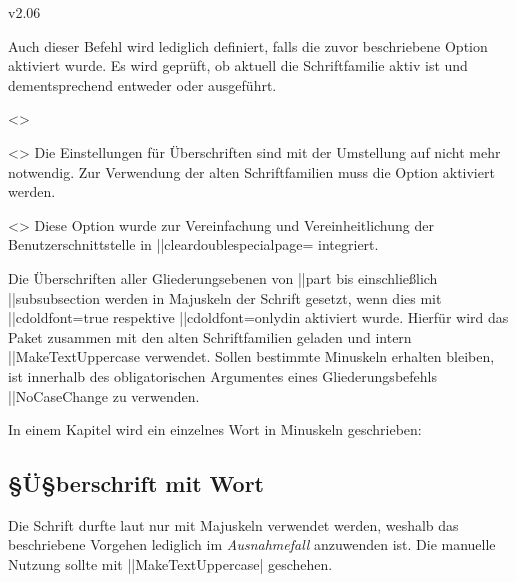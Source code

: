 \begin{Changes}{v2.06}
\begin{Obsolete}
  {}
\printdeclarationlist
%
Auch dieser Befehl wird lediglich definiert, falls die zuvor beschriebene 
Option  aktiviert wurde. Es wird geprüft, ob aktuell die 
Schriftfamilie \DIN aktiv ist und dementsprechend entweder  
oder  ausgeführt. 
\end{Obsolete}

\begin{Obsolete}
  {}
  <>
\begin{Obsolete}
  {}
  <>
\printdeclarationlist
%
Die Einstellungen für Überschriften sind mit der Umstellung auf \OpenSans nicht 
mehr notwendig. Zur Verwendung der alten Schriftfamilien muss die Option 
 aktiviert werden.
\end{Obsolete}
\end{Obsolete}

\begin{Obsolete}
  {}
  <>
\printdeclarationlist
%
Diese Option wurde zur Vereinfachung und Vereinheitlichung der 
Benutzerschnittstelle in \Option||{cleardoublespecialpage=\PMisc} integriert.
\end{Obsolete}



%
Die Überschriften aller Gliederungsebenen von \Macro||{part} bis einschließlich 
\Macro||{subsubsection} werden in Majuskeln der Schrift \DIN gesetzt, wenn dies 
mit \Option||{cdoldfont=true} respektive \Option||{cdoldfont=onlydin} aktiviert 
wurde. Hierfür wird das Paket  zusammen mit den alten 
Schriftfamilien geladen und intern \Macro||{MakeTextUppercase} verwendet. 
Sollen bestimmte Minuskeln erhalten bleiben, ist innerhalb des obligatorischen 
Argumentes eines Gliederungsbefehls \Macro||{NoCaseChange} zu verwenden.
%
\begin{Example}
In einem Kapitel wird ein einzelnes Wort in Minuskeln geschrieben:
\begin{Code}[escapechar=§]
\chapter{§Ü§berschrift mit  Wort}
\end{Code}
\end{Example}
%
Die Schrift \DIN durfte laut \CD nur mit Majuskeln verwendet werden, weshalb 
das beschriebene Vorgehen lediglich im \emph{Ausnahmefall} anzuwenden ist. 
Die manuelle Nutzung sollte mit 
\Macro||{MakeTextUppercase|} geschehen.%
%
\end{Changes}


